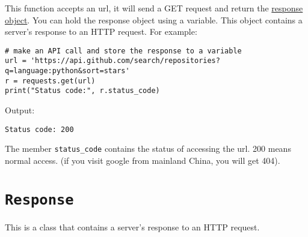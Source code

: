 \documentclass[12pt]{book}
\begin{document}
This function accepts an url, it will send a GET request and return the \href{https://2.python-requests.org/en/master/api/\#requests.Response}{response object}. You can hold the response object using a variable. This object contains a server's response to an HTTP request. For example:
\begin{verbatim}
# make an API call and store the response to a variable
url = 'https://api.github.com/search/repositories?q=language:python&sort=stars'
r = requests.get(url)
print("Status code:", r.status_code)
\end{verbatim}
Output:
\begin{verbatim}
Status code: 200
\end{verbatim}
The member \texttt{status\_code} contains the status of accessing the url. 200 means normal access. (if you visit google from mainland China, you will get 404).

\section{\texttt{Response}}
\label{sec:org824bd49}
This is a class that contains a server's response to an HTTP request.
\end{document}
